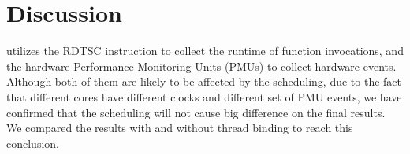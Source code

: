 \section{Discussion}
\label{sec:limitation}
\MP{} utilizes the RDTSC instruction to collect the runtime of function invocations, and the hardware Performance Monitoring Units (PMUs) to collect hardware events. Although  both of them are likely to be affected by the scheduling,  due to the fact that different cores have different clocks and different set of PMU events, we have confirmed that the scheduling will not cause big difference on the final results. We compared the results with and without thread binding to reach this conclusion. 



